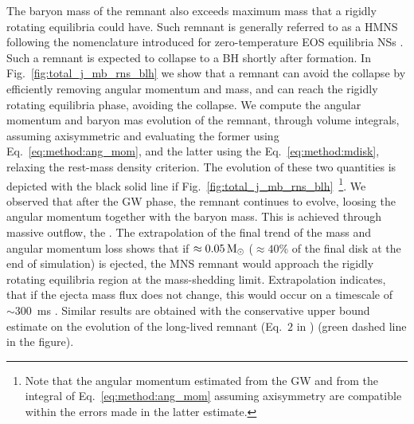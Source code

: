 The baryon mass of the remnant also exceeds maximum mass that a rigidly rotating 
equilibria could have. Such remnant is generally referred to as a \ac{HMNS} following the 
nomenclature introduced for zero-temperature \ac{EOS} equilibria \acp{NS} \citep{Baumgarte:1999cq}.
Such a remnant is expected to collapse to a \ac{BH} shortly after formation. 
In Fig.~\ref{fig:total_j_mb_rns_blh} we show that a remnant can avoid the collapse by 
efficiently removing angular momentum and mass, and can reach the rigidly rotating equilibria phase,
avoiding the collapse.
%
We compute the angular momentum and baryon mas evolution of the remnant, 
through volume integrals, assuming axisymmetric and evaluating the former using 
Eq.~\eqref{eq:method:ang_mom}, and the latter using the Eq.~\eqref{eq:method:mdisk},
relaxing the rest-mass density criterion. 
The evolution of these two quantities is depicted with the black solid line if 
Fig.~\eqref{fig:total_j_mb_rns_blh}~\footnote{
    Note that the angular momentum estimated
    from the \ac{GW} and from the integral of Eq.~\eqref{eq:method:ang_mom} assuming
    axisymmetry are compatible within the errors made in the latter estimate.
}.
%
We observed that after the \ac{GW} phase, the remnant continues to evolve, loosing the 
angular momentum together with the baryon mass. This is achieved through massive outflow,
the \swind{}. 
%
The extrapolation of the final trend of the mass and angular momentum loss shows that 
if $\approx0.05\,{\text{M}_{\odot}}$ ($\approx40$\% of the final disk at the end of simulation) is 
ejected, the \ac{MNS} remnant would approach the rigidly rotating equilibria region 
at the mass-shedding limit. Extrapolation indicates, that if the ejecta mass flux does 
not change, this would occur on a timescale of $\sim 300$~ms \pmerg{}.
%
Similar results are obtained with the conservative upper bound estimate on the 
evolution of the long-lived remnant (Eq.~$2$ in \citet{Radice:2018xqa}) (green dashed line in 
the figure). 
%
